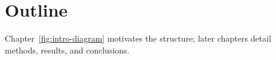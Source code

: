 \section{Outline}
Chapter~\ref{fig:intro-diagram} motivates the structure; later chapters detail methods, results, and conclusions.
